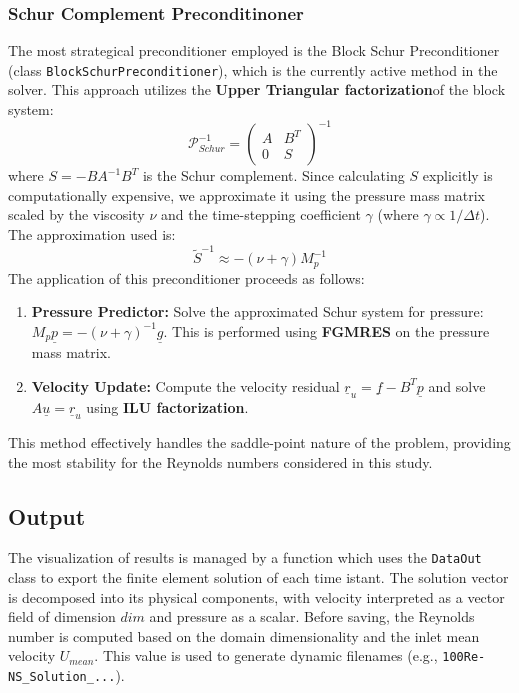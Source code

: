 \documentclass[11pt,a4paper]{article}
\renewcommand{\vec}[1]{\underline{#1}} %
\begin{document}
\subsubsection{Schur Complement Preconditinoner}

The most strategical preconditioner employed is the Block Schur Preconditioner (class \texttt{BlockSchurPreconditioner}), which is the currently active method in the solver. This approach utilizes the \textbf{Upper Triangular factorization}of the block system:
\begin{equation}
    \mathcal{P}_{Schur}^{-1} = 
    \begin{pmatrix} 
    A & B^T \\ 
    0 & S 
    \end{pmatrix}^{-1}
\end{equation}
where $S = -B A^{-1} B^T$ is the Schur complement. Since calculating $S$ explicitly is computationally expensive, we approximate it using the pressure mass matrix scaled by the viscosity $\nu$ and the time-stepping coefficient $\gamma$ (where $\gamma \propto 1/\Delta t$). The approximation used is:
\begin{equation}
    \tilde{S}^{-1} \approx -(\nu + \gamma) M_p^{-1}
\end{equation}
The application of this preconditioner proceeds as follows:
\begin{enumerate}
    \item \textbf{Pressure Predictor:} Solve the approximated Schur system for pressure: $M_p \vec{p} = -(\nu + \gamma)^{-1} \vec{g}$. This is performed using \textbf{FGMRES} on the pressure mass matrix.
    \item \textbf{Velocity Update:} Compute the velocity residual $\vec{r}_u = \vec{f} - B^T \vec{p}$ and solve $A \vec{u} = \vec{r}_u$ using \textbf{ILU factorization}.
\end{enumerate}
This method effectively handles the saddle-point nature of the problem, providing the most stability for the Reynolds numbers considered in this study. 

\subsection{Output}
The visualization of results is managed by a function which uses the \texttt{DataOut} class to export the finite element solution of each time istant. The solution vector is decomposed into its physical components, with velocity interpreted as a vector field of dimension $dim$ and pressure as a scalar. Before saving, the Reynolds number is computed based on the domain dimensionality and the inlet mean velocity $U_{mean}$. This value is used to generate dynamic filenames (e.g., \texttt{100Re-NS\_Solution\_...}).
\end{document}
